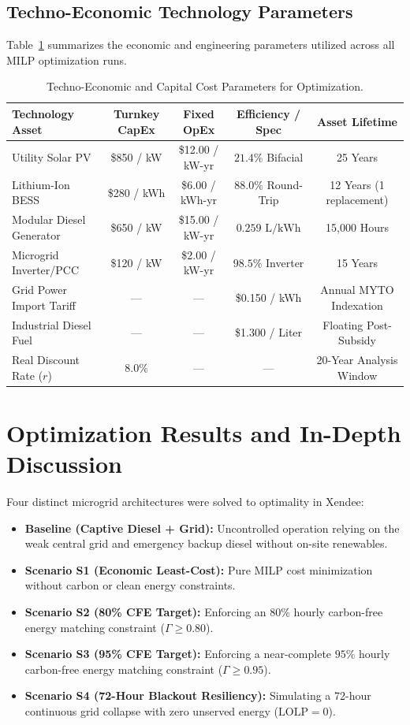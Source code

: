 \documentclass[12pt,3p,review]{elsarticle}
\begin{document}
\subsection{Techno-Economic Technology Parameters}
Table~\ref{tab:costs} summarizes the economic and engineering parameters utilized across all MILP optimization runs.

\begin{table}[htbp]
\centering
\caption{Techno-Economic and Capital Cost Parameters for Optimization.}
\label{tab:costs}
\begin{tabular}{lcccc}
\toprule
\textbf{Technology Asset} & \textbf{Turnkey CapEx} & \textbf{Fixed OpEx} & \textbf{Efficiency / Spec} & \textbf{Asset Lifetime} \\
\midrule
Utility Solar PV & \$850 / kW & \$12.00 / kW-yr & $21.4\%$ Bifacial & 25 Years \\
Lithium-Ion BESS & \$280 / kWh & \$6.00 / kWh-yr & $88.0\%$ Round-Trip & 12 Years (1 replacement) \\
Modular Diesel Generator & \$650 / kW & \$15.00 / kW-yr & $0.259\text{ L/kWh}$ & 15,000 Hours \\
Microgrid Inverter/PCC & \$120 / kW & \$2.00 / kW-yr & $98.5\%$ Inverter & 15 Years \\
Grid Power Import Tariff & — & — & \$0.150 / kWh & Annual MYTO Indexation \\
Industrial Diesel Fuel & — & — & \$1.300 / Liter & Floating Post-Subsidy \\
Real Discount Rate ($r$) & $8.0\%$ & — & — & 20-Year Analysis Window \\
\bottomrule
\end{tabular}
\end{table}

\section{Optimization Results and In-Depth Discussion}
\label{sec:results}

Four distinct microgrid architectures were solved to optimality in Xendee:
\begin{itemize}
    \item \textbf{Baseline (Captive Diesel + Grid):} Uncontrolled operation relying on the weak central grid and emergency backup diesel without on-site renewables.
    \item \textbf{Scenario S1 (Economic Least-Cost):} Pure MILP cost minimization without carbon or clean energy constraints.
    \item \textbf{Scenario S2 (80\% CFE Target):} Enforcing an $80\%$ hourly carbon-free energy matching constraint ($\Gamma \ge 0.80$).
    \item \textbf{Scenario S3 (95\% CFE Target):} Enforcing a near-complete $95\%$ hourly carbon-free energy matching constraint ($\Gamma \ge 0.95$).
    \item \textbf{Scenario S4 (72-Hour Blackout Resiliency):} Simulating a 72-hour continuous grid collapse with zero unserved energy ($\text{LOLP}=0$).
\end{itemize}
\end{document}
